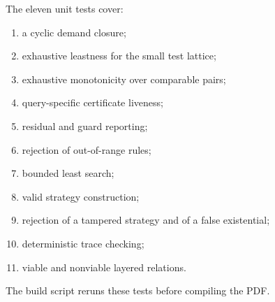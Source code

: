 The eleven unit tests cover:
\begin{enumerate}
  \item a cyclic demand closure;
  \item exhaustive leastness for the small test lattice;
  \item exhaustive monotonicity over comparable pairs;
  \item query-specific certificate liveness;
  \item residual and guard reporting;
  \item rejection of out-of-range rules;
  \item bounded least search;
  \item valid strategy construction;
  \item rejection of a tampered strategy and of a false existential;
  \item deterministic trace checking;
  \item viable and nonviable layered relations.
\end{enumerate}
The build script reruns these tests before compiling the PDF.
